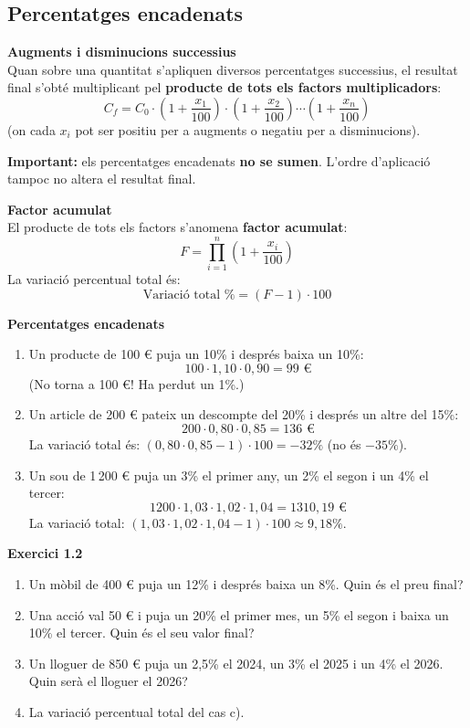 \documentclass[12pt]{article}
\begin{document}
\subsection{Percentatges encadenats}

\begin{concept}
\textbf{Augments i disminucions successius}\\
Quan sobre una quantitat s'apliquen diversos percentatges successius, el resultat final s'obté multiplicant pel \textbf{producte de tots els factors multiplicadors}:
\[
C_f = C_0 \cdot \left(1 + \dfrac{x_1}{100}\right) \cdot \left(1 + \dfrac{x_2}{100}\right) \cdots \left(1 + \dfrac{x_n}{100}\right)
\]
(on cada $x_i$ pot ser positiu per a augments o negatiu per a disminucions).

\textbf{Important:} els percentatges encadenats \textbf{no se sumen}. L'ordre d'aplicació tampoc no altera el resultat final.

\textbf{Factor acumulat}\\
El producte de tots els factors s'anomena \textbf{factor acumulat}:
\[
F = \prod_{i=1}^{n} \left(1 + \dfrac{x_i}{100}\right)
\]
La variació percentual total és:
\[
\text{Variació total \%} = (F - 1) \cdot 100
\]
\end{concept}

\begin{exemple}
\textbf{Percentatges encadenats}
\begin{enumerate}[label=\alph*)]
    \item Un producte de 100 € puja un 10\% i després baixa un 10\%:
    \[
    100 \cdot 1{,}10 \cdot 0{,}90 = 99 \text{ €}
    \]
    (No torna a 100 €! Ha perdut un 1\%.)
    \item Un article de 200 € pateix un descompte del 20\% i després un altre del 15\%:
    \[
    200 \cdot 0{,}80 \cdot 0{,}85 = 136 \text{ €}
    \]
    La variació total és: $(0{,}80 \cdot 0{,}85 - 1) \cdot 100 = -32\%$ (no és $-35\%$).
    \item Un sou de 1\,200 € puja un 3\% el primer any, un 2\% el segon i un 4\% el tercer:
    \[
    1200 \cdot 1{,}03 \cdot 1{,}02 \cdot 1{,}04 = 1310{,}19 \text{ €}
    \]
    La variació total: $(1{,}03 \cdot 1{,}02 \cdot 1{,}04 - 1) \cdot 100 \approx 9{,}18\%$.
\end{enumerate}
\end{exemple}

\begin{exercici}
\textbf{Exercici 1.2}\\
\begin{enumerate}[label=\alph*)]
    \item Un mòbil de 400 € puja un 12\% i després baixa un 8\%. Quin és el preu final?
    \item Una acció val 50 € i puja un 20\% el primer mes, un 5\% el segon i baixa un 10\% el tercer. Quin és el seu valor final?
    \item Un lloguer de 850 € puja un 2{,}5\% el 2024, un 3\% el 2025 i un 4\% el 2026. Quin serà el lloguer el 2026?
    \item La variació percentual total del cas c).
\end{enumerate}
\end{exercici}
\end{document}
